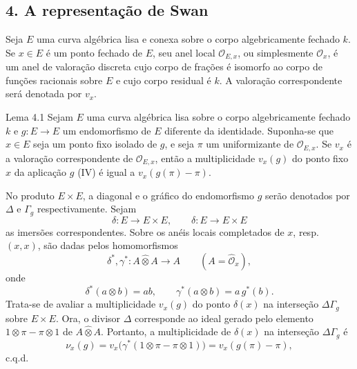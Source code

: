 \subsection*{4. A representação de Swan}

Seja $E$ uma curva algébrica lisa e conexa sobre o corpo algebricamente fechado $k$. Se $x\in E$ é um ponto fechado de $E$, seu anel local $\mathcal O_{E,x}$, ou simplesmente $\mathcal O_x$, é um anel de valoração discreta cujo corpo de frações é isomorfo ao corpo de funções racionais sobre $E$ e cujo corpo residual é $k$. A valoração correspondente será denotada por $v_x$.

\begin{statement}{Lema 4.1}
Sejam $E$ uma curva algébrica lisa sobre o corpo algebricamente fechado $k$ e $g:E\to E$ um endomorfismo de $E$ diferente da identidade. Suponha-se que $x\in E$ seja um ponto fixo isolado de $g$, e seja $\pi$ um uniformizante de $\mathcal O_{E,x}$. Se $v_x$ é a valoração correspondente de $\mathcal O_{E,x}$, então a multiplicidade $v_x(g)$ do ponto fixo $x$ da aplicação $g$ (IV) é igual a $v_x(g(\pi)-\pi)$.
\end{statement}


No produto $E\times E$, a diagonal e o gráfico do endomorfismo $g$ serão denotados por $\Delta$ e $\Gamma_g$ respectivamente. Sejam
\[
\delta:E\longrightarrow E\times E,\qquad
\delta:E\longrightarrow E\times E
\]
as imersões correspondentes. Sobre os anéis locais completados de $x$, resp. $(x,x)$, são dadas pelos homomorfismos
\[
\delta^*,\gamma^*:A\widehat\otimes A\longrightarrow A
\qquad (A=\widehat{\mathcal O}_x),
\]
onde
\[
\delta^*(a\otimes b)=ab,\qquad
\gamma^*(a\otimes b)=a\,g^*(b).
\]
Trata-se de avaliar a multiplicidade $v_x(g)$ do ponto $\delta(x)$ na interseção $\Delta\Gamma_g$ sobre $E\times E$. Ora, o divisor $\Delta$ corresponde ao ideal gerado pelo elemento $1\otimes\pi-\pi\otimes1$ de $A\widehat\otimes A$. Portanto, a multiplicidade de $\delta(x)$ na interseção $\Delta\Gamma_g$ é
\[
\nu_x(g)=v_x\bigl(\gamma^*(1\otimes\pi-\pi\otimes1)\bigr)
      =v_x(g(\pi)-\pi),
\]
c.q.d.
